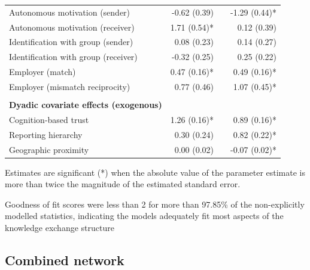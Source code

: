 \begin{table}[hbt!]
{\begin{threeparttable}
\begin{tabular}{@{}lrlr@{}}
Autonomous motivation (sender) & -0.62 (0.39)\phantom{*} &  & -1.29 (0.44)* \\
Autonomous motivation (receiver) & 1.71 (0.54)* &  & 0.12 (0.39)\phantom{*} \\
Identification with group (sender) & 0.08 (0.23)\phantom{*} &  & 0.14 (0.27)\phantom{*} \\
Identification with group (receiver) & -0.32 (0.25)\phantom{*} &  & 0.25 (0.22)\phantom{*} \\
Employer (match) & 0.47 (0.16)* &  & 0.49 (0.16)* \\
Employer (mismatch reciprocity) & 0.77 (0.46)\phantom{*} &  & 1.07 (0.45)* \\
 &  &  &  \\
\textbf{Dyadic covariate effects (exogenous)} &  &  &  \\
Cognition-based trust & 1.26 (0.16)* &  & 0.89 (0.16)* \\
Reporting hierarchy & 0.30 (0.24)\phantom{*} &  & 0.82 (0.22)* \\
Geographic proximity & 0.00 (0.02)\phantom{*} &  & -0.07 (0.02)* \\ \bottomrule
\end{tabular}
    \begin{tablenotes}
      \small
      \item Estimates are significant (*) when the absolute value of the parameter estimate is more than twice the magnitude of the estimated standard error.
      \item Goodness of fit scores were less than 2 for more than 97.85\% of the non-explicitly modelled statistics, indicating the models adequately fit most aspects of the knowledge exchange structure
    \end{tablenotes}
\end{threeparttable}
}
\end{table}

\subsection{Combined network}

